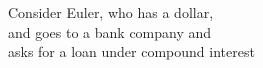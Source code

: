 \documentclass[preview]{standalone}
\begin{document}
\begin{center}
Consider Euler, who has a dollar, \\ and goes to a bank company and \\ asks for a loan under compound interest
\end{center}
\end{document}
